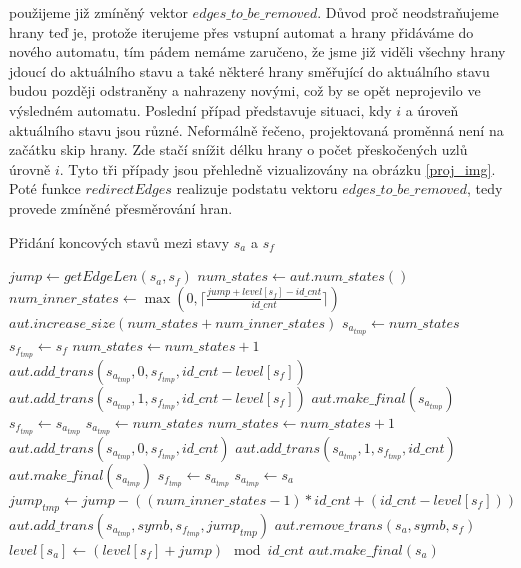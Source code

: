 \noindent
použijeme již zmíněný vektor $edges\_to\_be\_removed$. Důvod proč neodstraňujeme hrany teď je, protože iterujeme přes vstupní automat a hrany přidáváme do nového automatu, tím pádem nemáme zaručeno, že jsme již viděli všechny hrany jdoucí do aktuálního stavu a také některé hrany směřující do aktuálního stavu budou později odstraněny a nahrazeny novými, což by se opět neprojevilo ve výsledném automatu. Poslední případ představuje situaci, kdy $i$ a úroveň aktuálního stavu jsou různé. Neformálně řečeno, projektovaná proměnná není na začátku skip hrany. Zde stačí snížit délku hrany o počet přeskočených uzlů úrovně $i$. Tyto tři případy jsou přehledně vizualizovány na obrázku \ref{proj_img}. Poté funkce $redirectEdges$ realizuje podstatu vektoru $edges\_to\_be\_removed$, tedy provede zmíněné přesměrování hran.

\begin{algorithm}[t]
    \caption{Přidání koncových stavů mezi stavy $s_a$ a $s_f$}
    \label{addFinalStatesRev}
        \begin{algorithmic}[1]
                \State $jump \gets getEdgeLen(s_a,s_f)$
                \State $num\_states \gets aut.num\_states()$
                \State $num\_inner\_states \gets \max (0,\lceil \frac{jump + level[s_f] - id\_cnt}{id\_cnt} \rceil)$
                \State $aut.increase\_size(num\_states + num\_inner\_states)$
                    \State $s_{a_{tmp}} \gets num\_states$
                    \State $s_{f_{tmp}} \gets s_f$
                    \State $num\_states \gets num\_states + 1$
                    \State $aut.add\_trans(s_{a_{tmp}},0,s_{f_{tmp}},id\_cnt-level[s_f])$
                    \State $aut.add\_trans(s_{a_{tmp}},1,s_{f_{tmp}},id\_cnt-level[s_f])$
                    \State $aut.make\_final(s_{a_{tmp}})$
                        \State $s_{f_{tmp}} \gets s_{a_{tmp}}$
                        \State $s_{a_{tmp}} \gets num\_states$
                        \State $num\_states \gets num\_states + 1$
                        \State $aut.add\_trans(s_{a_{tmp}}, 0, s_{f_{tmp}}, id\_cnt)$
                        \State $aut.add\_trans(s_{a_{tmp}}, 1, s_{f_{tmp}}, id\_cnt)$
                        \State $aut.make\_final(s_{a_{tmp}})$
                    \EndFor
                    \State $s_{f_{tmp}} \gets s_{a_{tmp}}$
                    \State $s_{a_{tmp}} \gets s_a$
                    \State $jump_{tmp} \gets jump - ((num\_inner\_states - 1) * id\_cnt + (id\_cnt - level[s_f]))$
                    \State $aut.add\_trans(s_{a_{tmp}}, symb, s_{f_{tmp}}, jump_{tmp})$
                    \State $aut.remove\_trans(s_a, symb, s_f)$
                \EndIf
                \State $level[s_a] \gets (level[s_f] + jump) \mod id\_cnt$
                    \State $aut.make\_final(s_a)$
                \EndIf
            \EndProcedure
        \end{algorithmic}
\end{algorithm}


